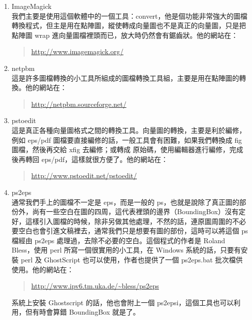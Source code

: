 \begin{enumerate}
  \item {\sffamily ImageMagick} \\
        我們主要是使用這個軟體中的一個工具：{\ttfamily convert}，他是個功能非常強大的圖檔轉換程式，但主是用在點陣圖，縱使轉成向量圖也不是真正的向量圖，只是把點陣圖 wrap 進向量圖檔裡頭而已，放大時仍然會有鋸齒狀。他的網站在：

        \begin{quote}
          \url{http://www.imagemagick.org/}
        \end{quote}

  \item {\sffamily netpbm}\\
        這是許多圖檔轉換的小工具所組成的圖檔轉換工具組，主要是用在點陣圖的轉換。他的網站在：

        \begin{quote}
          \url{http://netpbm.sourceforge.net/}
        \end{quote}

  \item {\sffamily pstoedit}\\
        這是真正各種向量圖格式之間的轉換工具。向量圖的轉換，主要是利於編修，例如 eps/pdf 圖檔要直接編修的話，一般工具會有困難，如果我們轉換成 fig 圖檔，然後再交給 {\sffamily xfig} 去編修；或轉成 \MP{} 原始碼，使用編輯器進行編修，完成後再轉回 eps/pdf，這樣就很方便了。他的網站在：

        \begin{quote}
          \url{http://www.pstoedit.net/pstoedit/}
        \end{quote}

  \item {\sffamily ps2eps}\\
        通常我們手上的圖檔不一定是 eps，而是一般的 ps，也就是說除了真正圖的部份外，尚有一些空白在圖的四周，這代表裡頭的邊界（BoundingBox）沒有定好，這樣引入圖檔的時候，除非另做其他處理，不然的話，連原圖周圍的不必要空白也會引進文稿裡去，通常我們只是想要有圖的部份，這時可以將這個 ps 檔經由 {\ttfamily ps2eps} 處理過，去除不必要的空白。這個程式的作者是 Roland Bless，使用 {\sffamily perl} 所寫一個很實用的小工具，在 Windows 系統的話，只要有安裝 {\sffamily perl} 及 {\sffamily GhostScript} 也可以使用，作者也提供了一個 {\ttfamily ps2eps.bat} 批次檔供使用。他的網站在：

        \begin{quote}
          \url{http://www.ipv6.tm.uka.de/~bless/ps2eps}
        \end{quote}

        系統上安裝 {\sffamily Ghostscript} 的話，他也會附上一個 {\ttfamily ps2epsi}，這個工具也可以利用，但有時會算錯 BoundingBox 就是了。
\end{enumerate}

